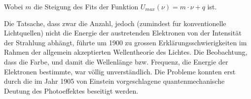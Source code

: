 Wobei $m$ die Steigung des Fits der Funktion  $U_{max}(\nu)  =  m\cdot\nu + q$
ist.

Die  Tatsache,  dass  zwar  die  Anzahl, jedoch (zumindest fur  konventionelle
Lichtquellen)   nicht   die   Energie  der  austretenden  Elektronen  von  der
Intensit\"at  der   Strahlung   abh\"angt,   f\"uhrte   um   1900  zu  grossen
Erkl\"arungsschwierigkeiten im Rahmen der allgemein akzeptierten Wellentheorie
des Lichtes. Die Beobachtung, dass die Farbe, und damit die Wellenl\"ange bzw.
Frequenz, die Energie der Elektronen bestimmte, war v\"ollig unverst\"andlich.
Die Probleme konnten erst durch die im Jahr 1905 von  Einstein  vorgeschlagene
quantenmechanische Deutung des Photoeffektes beseitigt werden.

